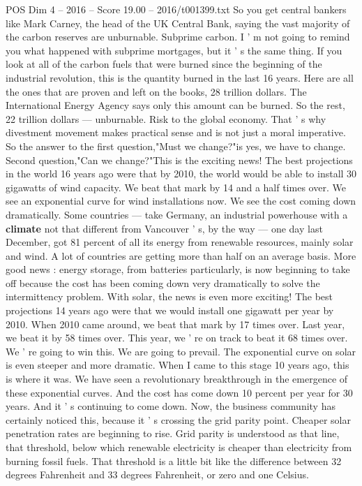 \begin{textsample}{POS Dim 4 – 2016 – Score 19.00 – 2016/t001399.txt}
So you get central bankers like Mark Carney, the head of the UK Central Bank, saying the vast majority of the carbon reserves are unburnable.
Subprime carbon.
I ' m not going to remind you what happened with subprime mortgages, but it ' s the same thing.
If you look at all of the carbon fuels that were burned since the beginning of the industrial revolution, this is the quantity burned in the last 16 years.
Here are all the ones that are proven and left on the books, 28 trillion dollars.
The International Energy Agency says only this amount can be burned.
So the rest, 22 trillion dollars — unburnable.
Risk to the global economy.
That ' s why divestment movement makes practical sense and is not just a moral imperative.
So the answer to the first question,"Must we change?"is yes, we have to change.
Second question,"Can we change?"This is the exciting news!
The best projections in the world 16 years ago were that by 2010, the world would be able to install 30 gigawatts of wind capacity.
We beat that mark by 14 and a half times over.
We see an exponential curve for wind installations now.
We see the cost coming down dramatically.
Some countries — take Germany, an industrial powerhouse with a \textbf{climate} not that different from Vancouver ' s, by the way — one day last December, got 81 percent of all its energy from renewable resources, mainly solar and wind.
A lot of countries are getting more than half on an average basis.
More good news : energy storage, from batteries particularly, is now beginning to take off because the cost has been coming down very dramatically to solve the intermittency problem.
With solar, the news is even more exciting!
The best projections 14 years ago were that we would install one gigawatt per year by 2010.
When 2010 came around, we beat that mark by 17 times over.
Last year, we beat it by 58 times over.
This year, we ' re on track to beat it 68 times over.
We ' re going to win this.
We are going to prevail.
The exponential curve on solar is even steeper and more dramatic.
When I came to this stage 10 years ago, this is where it was.
We have seen a revolutionary breakthrough in the emergence of these exponential curves.
And the cost has come down 10 percent per year for 30 years.
And it ' s continuing to come down.
Now, the business community has certainly noticed this, because it ' s crossing the grid parity point.
Cheaper solar penetration rates are beginning to rise.
Grid parity is understood as that line, that threshold, below which renewable electricity is cheaper than electricity from burning fossil fuels.
That threshold is a little bit like the difference between 32 degrees Fahrenheit and 33 degrees Fahrenheit, or zero and one Celsius.

\end{textsample}
